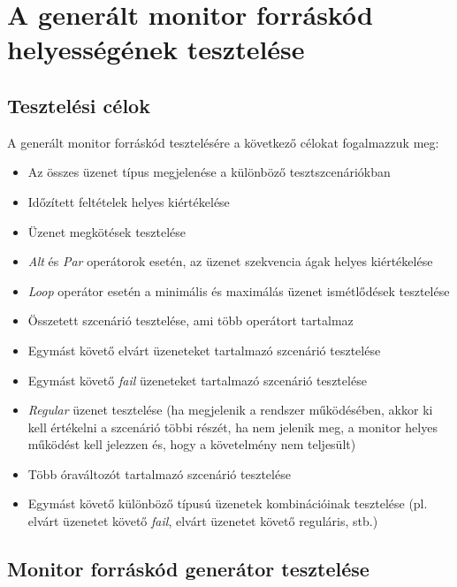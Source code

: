 \chapter{A generált monitor forráskód helyességének tesztelése}

\section{Tesztelési célok}

A generált monitor forráskód tesztelésére a következő célokat fogalmazzuk meg:

\begin{itemize}
    \item Az összes üzenet típus megjelenése a különböző tesztszcenáriókban
    \item Időzített feltételek helyes kiértékelése
    \item Üzenet megkötések tesztelése
    \item \textit{Alt} és \textit{Par} operátorok esetén, az üzenet szekvencia ágak helyes kiértékelése
    \item \textit{Loop} operátor esetén a minimális és maximálás üzenet ismétlődések tesztelése
    \item Összetett szcenárió tesztelése, ami több operátort tartalmaz
    \item Egymást követő elvárt üzeneteket tartalmazó szcenárió tesztelése
    \item Egymást követő \textit{fail} üzeneteket tartalmazó szcenárió tesztelése
    \item \textit{Regular} üzenet tesztelése (ha megjelenik a rendszer működésében, akkor ki kell értékelni a szcenárió többi részét, ha nem jelenik meg, a monitor helyes működést kell jelezzen és, hogy a követelmény nem teljesült)
    \item Több óraváltozót tartalmazó szcenárió tesztelése
    \item Egymást követő különböző típusú üzenetek kombinációinak tesztelése (pl. elvárt üzenetet követő \textit{fail}, elvárt üzenetet követő reguláris, stb.)
\end{itemize}

\clearpage\section{Monitor forráskód generátor tesztelése}

